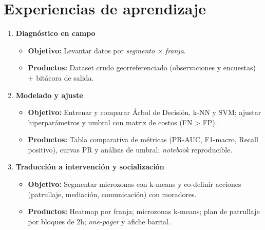\documentclass[a4,11pt]{aleph-notas}
\begin{document}
\section{Experiencias de aprendizaje}
\begin{enumerate}[label=\textbf{\arabic*.}]
    \item \textbf{Diagnóstico en campo} 
    \begin{itemize}
        \item \textbf{Objetivo:} Levantar datos por \textit{segmento × franja}.
        \item \textbf{Productos:} Dataset crudo georreferenciado (observaciones y encuestas) + bitácora de salida.
    \end{itemize}

    \item \textbf{Modelado y ajuste}
    \begin{itemize}
        \item \textbf{Objetivo:} Entrenar y comparar Árbol de Decisión, k-NN y SVM; ajustar hiperparámetros y umbral con matriz de costos (FN > FP).
        \item \textbf{Productos:} Tabla comparativa de métricas (PR-AUC, F1-macro, Recall positivo), curvas PR y análisis de umbral; \emph{notebook} reproducible.
    \end{itemize}

    \item \textbf{Traducción a intervención y socialización} 
    \begin{itemize}
        \item \textbf{Objetivo:} Segmentar microzonas con k-means y co-definir acciones (patrullaje, mediación, comunicación) con moradores.
        \item \textbf{Productos:} Heatmap por franja; microzonas k-means; plan de patrullaje por bloques de 2h; \emph{one-pager} y afiche barrial.
    \end{itemize}
\end{enumerate}
\end{document}
